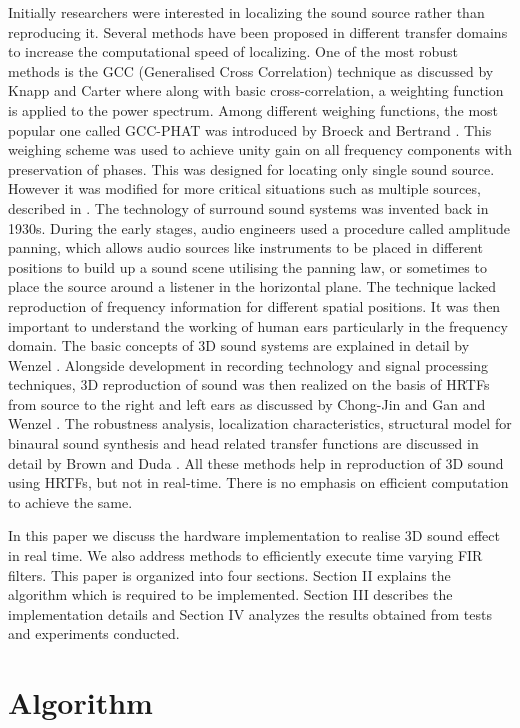 \documentclass[conference]{IEEEtran}
\begin{document}
Initially researchers were interested in localizing the sound source rather than reproducing it. Several methods have been proposed in different transfer domains to increase the computational speed of localizing. One of the most robust methods is the GCC (Generalised Cross Correlation) technique as discussed by Knapp and Carter \cite{two} where along with basic cross-correlation, a weighting function is applied to the power spectrum. Among different weighing functions, the most popular one called GCC-PHAT was introduced by Broeck and Bertrand \cite{one}. This weighing scheme was used to achieve unity gain on all frequency components with preservation of phases.  This was designed for locating only single sound source. However it was modified for more critical situations such as multiple sources, described in \cite{three}. The technology of surround sound systems was invented back in 1930s. During the early stages, audio engineers used a procedure called amplitude panning, which allows audio sources like instruments to be placed in different positions to build up a sound scene utilising the panning law, or sometimes to place the source around a listener in the horizontal plane. The technique lacked reproduction of frequency information for different spatial positions. It was then important to understand the working of human ears particularly in the frequency domain. The basic concepts of 3D sound systems are explained in detail by Wenzel \cite{four}. Alongside development in recording technology and signal processing techniques, 3D reproduction of sound was then realized on the basis of HRTFs from source to the right and left ears as discussed by Chong-Jin and Gan \cite{six} and Wenzel \cite{four}. The  robustness  analysis,  localization  characteristics,  structural  model  for  binaural  sound  synthesis  and  head related transfer functions are discussed in detail by Brown and Duda \cite{seven}. All these methods help in reproduction of 3D sound using HRTFs, but not in real-time. There is no emphasis on efficient computation to achieve the same.  

In this paper we discuss the hardware implementation to realise 3D sound effect in real time. We also address methods to efficiently execute time varying FIR filters. This paper is organized into four sections. Section II explains the algorithm which is required to be implemented. Section III describes the implementation details and Section IV analyzes the results obtained from tests and experiments conducted.  


\section{Algorithm}
\end{document}
